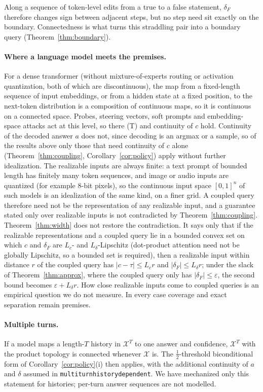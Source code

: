 \documentclass[10pt]{article}
\theoremstyle{definition}
\theoremstyle{remark}
\newcommand{\X}{\mathcal{X}}
\newcommand{\conf}{c}
\newcommand{\dF}{\delta_{\!F}}
\newcommand{\leanid}[1]{{\def\_{\textunderscore\allowbreak}\texttt{#1}}}
\begin{document}
Along a sequence of token-level edits from a true to a false statement,
$\dF$ therefore changes sign between adjacent steps, but no step need sit
exactly on the boundary. Connectedness is what turns this straddling pair
into a boundary query (Theorem~\ref{thm:boundary}).

\paragraph{Where a language model meets the premises.}
For a dense transformer (without mixture-of-experts routing or activation
quantization, both of which are discontinuous), the map from a
fixed-length sequence of input embeddings, or from a hidden state at a
fixed position, to the next-token distribution is a composition of
continuous maps, so it is continuous on a connected space. Probes,
steering vectors, soft prompts and embedding-space attacks act at this
level, so there (T) and continuity of $\conf$ hold. Continuity of the
decoded answer $a$ does not, since decoding is an argmax or a sample, so
of the results above only those that need continuity of $\conf$ alone
(Theorem~\ref{thm:coupling}, Corollary~\ref{cor:policy}) apply without
further idealization. The realizable inputs are always finite: a text
prompt of bounded length has finitely many token sequences, and image or
audio inputs are quantized (for example 8-bit pixels), so the continuous
input space $[0,1]^n$ of such models is an idealization of the same kind,
on a finer grid. A coupled query therefore need not be the representation
of any realizable input, and a guarantee stated only over realizable
inputs is not contradicted by Theorem~\ref{thm:coupling}.
Theorem~\ref{thm:width} does not restore the contradiction. It says only
that if the realizable representations and a coupled query lie in a
bounded convex set on which $\conf$ and $\dF$ are $L_c$- and
$L_\delta$-Lipschitz (dot-product attention need not be globally
Lipschitz, so a bounded set is required), then a realizable input within
distance $r$ of the coupled query has $|\conf-\tau|\le L_c r$ and
$|\dF|\le L_\delta r$; under the slack of Theorem~\ref{thm:approx}, where
the coupled query only has $|\dF|\le\varepsilon$, the second bound becomes
$\varepsilon+L_\delta r$. How close realizable inputs come to coupled
queries is an empirical question we do not measure. In every case
coverage and exact separation remain premises.

\paragraph{Multiple turns.}
If a model maps a length-$T$ history in $\X^T$ to one answer and
confidence, $\X^T$ with the product topology is connected whenever $\X$
is. The $\tfrac12$-threshold biconditional form of
Corollary~\ref{cor:policy}(i) then applies, with the additional
continuity of $a$ and $\delta$ assumed in
\leanid{multi\_turn\_history\_dependent}. We have mechanized only this
statement for histories; per-turn answer sequences are not modelled.
\end{document}
